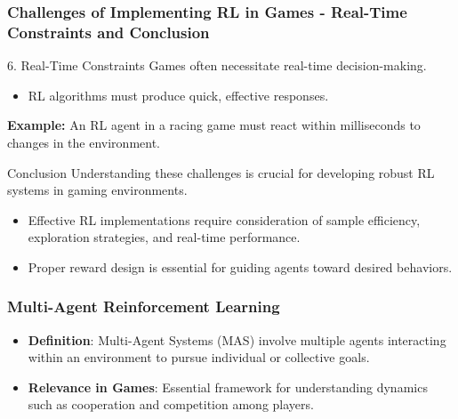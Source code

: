 \documentclass[aspectratio=169]{beamer}
\begin{document}
\begin{frame}[fragile]
    \frametitle{Challenges of Implementing RL in Games - Real-Time Constraints and Conclusion}
    \begin{block}{6. Real-Time Constraints}
        Games often necessitate real-time decision-making.
        \begin{itemize}
            \item RL algorithms must produce quick, effective responses.
        \end{itemize}
        \textbf{Example:} An RL agent in a racing game must react within milliseconds to changes in the environment.
    \end{block}

    \begin{block}{Conclusion}
        Understanding these challenges is crucial for developing robust RL systems in gaming environments.
        \begin{itemize}
            \item Effective RL implementations require consideration of sample efficiency, exploration strategies, and real-time performance.
            \item Proper reward design is essential for guiding agents toward desired behaviors.
        \end{itemize}
    \end{block}
\end{frame}

\begin{frame}[fragile]
    \frametitle{Multi-Agent Reinforcement Learning}
    \begin{itemize}
        \item \textbf{Definition}: Multi-Agent Systems (MAS) involve multiple agents interacting within an environment to pursue individual or collective goals.
        \item \textbf{Relevance in Games}: Essential framework for understanding dynamics such as cooperation and competition among players.
    \end{itemize}
\end{frame}
\end{document}
